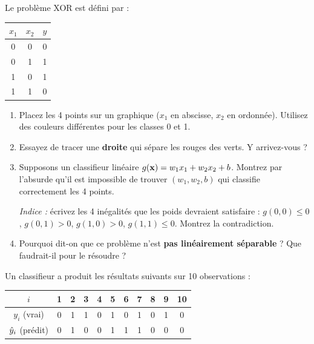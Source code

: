 
Le probl\`{e}me XOR est d\'{e}fini par :

\begin{center}
\renewcommand{\arraystretch}{1.15}
\begin{tabular}{cc|c}
    \toprule
    $x_1$ & $x_2$ & $y$ \\
    \midrule
    0 & 0 & 0 \\
    0 & 1 & 1 \\
    1 & 0 & 1 \\
    1 & 1 & 0 \\
    \bottomrule
\end{tabular}
\end{center}

\begin{enumerate}[label=\alph*)]
    \item Placez les 4 points sur un graphique ($x_1$ en abscisse, $x_2$ en ordonn\'{e}e).
        Utilisez des couleurs diff\'{e}rentes pour les classes 0 et 1.

    \item Essayez de tracer une \textbf{droite} qui s\'{e}pare les rouges des verts.
        Y arrivez-vous ?

    \item Supposons un classifieur lin\'{e}aire $g(\mathbf{x}) = w_1 x_1 + w_2 x_2 + b$.
        Montrez par l'absurde qu'il est impossible de trouver $(w_1, w_2, b)$
        qui classifie correctement les 4 points.

        \emph{Indice :} \'{e}crivez les 4 in\'{e}galit\'{e}s que les poids devraient satisfaire :
        $g(0,0) \leq 0$, $g(0,1) > 0$, $g(1,0) > 0$, $g(1,1) \leq 0$.
        Montrez la contradiction.

    \item Pourquoi dit-on que ce probl\`{e}me n'est \textbf{pas lin\'{e}airement s\'{e}parable} ?
        Que faudrait-il pour le r\'{e}soudre ?
\end{enumerate}


Un classifieur a produit les r\'{e}sultats suivants sur 10 observations :

\begin{center}
\renewcommand{\arraystretch}{1.15}
\begin{tabular}{c|cccccccccc}
    \toprule
    $i$       & 1 & 2 & 3 & 4 & 5 & 6 & 7 & 8 & 9 & 10 \\
    \midrule
    $y_i$ (vrai)  & 0 & 1 & 1 & 0 & 1 & 0 & 1 & 0 & 1 & 0 \\
    $\hat{y}_i$ (pr\'{e}dit)& 0 & 1 & 0 & 0 & 1 & 1 & 1 & 0 & 0 & 0 \\
    \bottomrule
\end{tabular}
\end{center}

